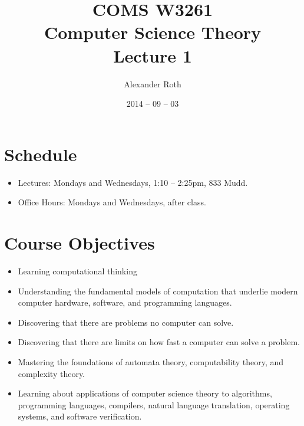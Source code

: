 \documentclass[]{article}
\begin{document}
\newtheorem{keyword}{Definition}
\newtheorem{example}{Example}

\title{COMS W3261 \\ Computer Science Theory \\ Lecture 1}
\author{Alexander Roth}
\date{2014 -- 09 -- 03}
\maketitle
\section{Schedule}
  \begin{itemize}
    \item Lectures: Mondays and Wednesdays, 1:10 -- 2:25pm, 833 Mudd.
    \item Office Hours: Mondays and Wednesdays, after class.
  \end{itemize}

\section{Course Objectives}
  \begin{itemize}
    \item Learning computational thinking
    \item Understanding the fundamental models of computation that underlie modern computer hardware, software, and programming languages.
    \item Discovering that there are problems no computer can solve.
    \item Discovering that there are limits on how fast a computer can solve a problem.
    \item Mastering the foundations of automata theory, computability theory, and complexity theory.
    \item Learning about applications of computer science theory to algorithms, programming languages, compilers, natural language translation, operating systems, and software verification.
  \end{itemize}
\end{document}
